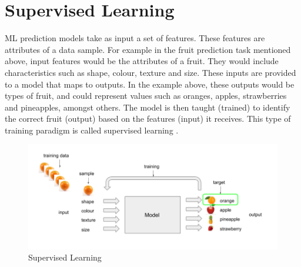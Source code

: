 
\section{Supervised Learning}

ML prediction models take as input a set of features. These features are attributes of a data sample. For example in the fruit prediction task mentioned above, input features would be the attributes of a fruit. They would include characteristics such as shape, colour, texture and size. These inputs are provided to a model that maps to outputs. In the example above, these outputs would be types of fruit, and could represent values such as oranges, apples, strawberries and pineapples, amongst others. The model is then taught (trained) to identify the correct fruit (output) based on the features (input) it receives. This type of training paradigm is called supervised learning \citep{bishop2006pattern, hastie2009elements, murphy2012machine}. \newline

\begin{figure}[H]
  	\caption{Supervised Learning}
   	\centering
    	\includegraphics[width=\textwidth]{supervised_learning}
\end{figure}

